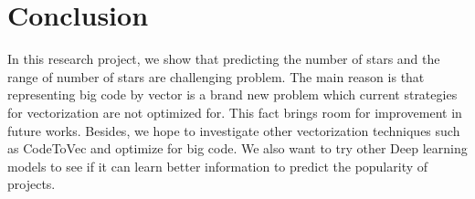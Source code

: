 \section*{Conclusion}
In this research project, we show that predicting the number of  stars and the range of number of stars are challenging problem. The main reason is that representing big code by vector is a brand new problem which current strategies for vectorization are not optimized for. This fact brings room for improvement in future works. Besides, we hope to investigate other vectorization techniques such as CodeToVec \cite{013} and optimize for big code. We also want to try other Deep learning models to see if it can learn better information to predict the popularity of projects.  